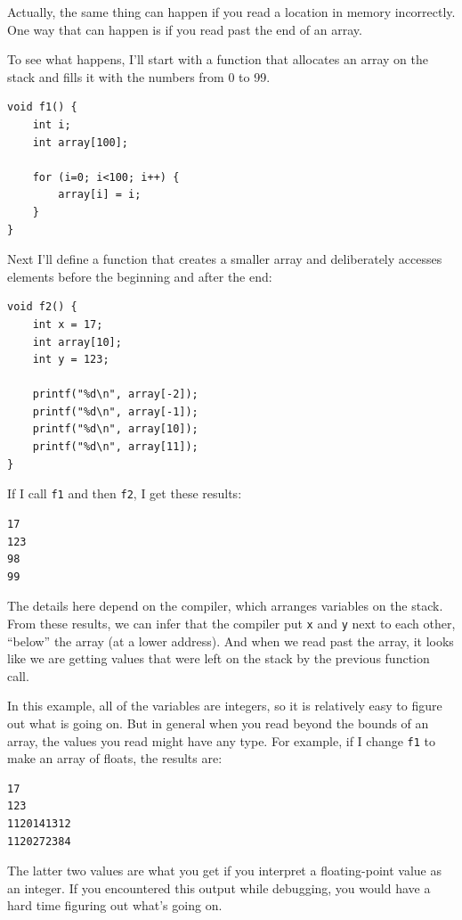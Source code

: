 \documentclass[12pt]{book}
\begin{document}
{Actually, the same thing can happen if you read a location in memory
incorrectly.  One way that can happen is if you read past the end of
an array.

To see what happens, I'll start with a function that allocates an
array on the stack and fills it with the numbers from 0 to 99.

\begin{verbatim}
void f1() {
    int i;
    int array[100];

    for (i=0; i<100; i++) {
        array[i] = i;
    }
}
\end{verbatim}

Next I'll define a function that creates a smaller array and
deliberately accesses elements before the beginning and after
the end:

\begin{verbatim}
void f2() {
    int x = 17;
    int array[10];
    int y = 123;

    printf("%d\n", array[-2]);
    printf("%d\n", array[-1]);
    printf("%d\n", array[10]);
    printf("%d\n", array[11]);
}
\end{verbatim}

If I call {\tt f1} and then {\tt f2}, I get these results:

\begin{verbatim}
17
123
98
99
\end{verbatim}

The details here depend on the compiler, which arranges variables
on the stack.  From these results, we can infer that the
compiler put {\tt x} and {\tt y} next to each other, ``below''
the array (at a lower address).  And when we read past the
array, it looks like we are getting values that were left on
the stack by the previous function call.

In this example, all of the variables are integers, so it is
relatively easy to figure out what is going on.  But in general
when you read beyond the bounds of an array, the values you
read might have any type.  For example, if I change {\tt f1}
to make an array of floats, the results are:

\begin{verbatim}
17
123
1120141312
1120272384
\end{verbatim}

The latter two values are what you get if you interpret a
floating-point value as an integer.  If you encountered this output
while debugging, you would have a hard time figuring out what's
going on.


}
\end{document}
